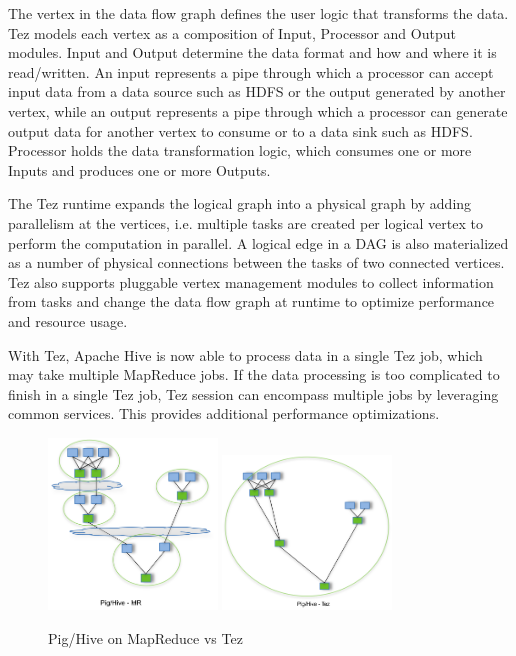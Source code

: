 \documentclass[12pt]{book}
\begin{document}
The vertex in the data flow graph defines the user logic that transforms the data. Tez models each vertex as a composition of Input, Processor and Output modules. Input and Output determine the data format and how and where it is read/written. An input represents a pipe through which a processor can accept input data from a data source such as HDFS or the output generated by another vertex, while an output represents a pipe through which a processor can generate output data for another vertex to consume or to a data sink such as HDFS. Processor holds the data transformation logic, which consumes one or more Inputs and produces one or more Outputs.

The Tez runtime expands the logical graph into a physical graph by adding parallelism at the vertices, i.e. multiple tasks are created per logical vertex to perform the computation in parallel. A logical edge in a DAG is also materialized as a number of physical connections between the tasks of two connected vertices. Tez also supports pluggable vertex management modules to collect information from tasks and change the data flow graph at runtime to optimize performance and resource usage.

With Tez, Apache Hive is now able to process data in a single Tez job, which may take multiple MapReduce jobs. If the data processing is too complicated to finish in a single Tez job, Tez session can encompass multiple jobs by leveraging common services. This provides additional performance optimizations.
\begin{figure}[t]
\includegraphics[width=0.4\textwidth]{images/PigHive_MR.png}
\includegraphics[width=0.4\textwidth]{images/PigHive_Tez.png}
\centering
\caption{Pig/Hive on MapReduce vs Tez}
\end{figure}
\end{document}

